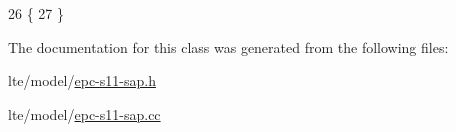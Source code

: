 \begin{DoxyCode}
26 \{
27 \}
\end{DoxyCode}


The documentation for this class was generated from the following files\+:\begin{DoxyCompactItemize}
\item 
lte/model/\hyperlink{epc-s11-sap_8h}{epc-\/s11-\/sap.\+h}\item 
lte/model/\hyperlink{epc-s11-sap_8cc}{epc-\/s11-\/sap.\+cc}\end{DoxyCompactItemize}

